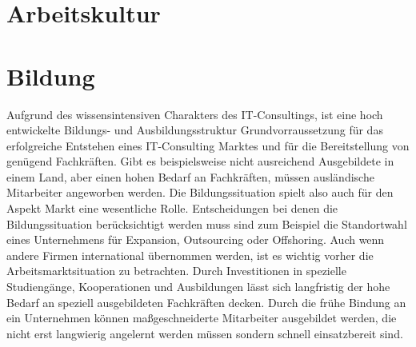 \chapter{Arbeitskultur}


\chapter{Bildung}
Aufgrund des wissensintensiven Charakters des IT-Consultings, ist eine hoch entwickelte Bildungs- und Ausbildungsstruktur Grundvorraussetzung für das erfolgreiche Entstehen eines IT-Consulting Marktes und für die Bereitstellung von genügend Fachkräften.
Gibt es beispielsweise nicht ausreichend Ausgebildete in einem Land, aber einen hohen Bedarf an Fachkräften, müssen ausländische Mitarbeiter angeworben werden. Die Bildungssituation spielt also auch für den Aspekt Markt eine wesentliche Rolle.
Entscheidungen bei denen die Bildungssituation berücksichtigt werden muss sind zum Beispiel die Standortwahl eines Unternehmens für Expansion, Outsourcing oder Offshoring. Auch wenn andere Firmen international übernommen werden, ist es wichtig vorher die Arbeitsmarktsituation zu betrachten. Durch Investitionen in spezielle Studiengänge, Kooperationen und Ausbildungen lässt sich langfristig der hohe Bedarf an speziell ausgebildeten Fachkräften decken. Durch die frühe Bindung an ein Unternehmen können maßgeschneiderte Mitarbeiter ausgebildet werden, die nicht erst langwierig angelernt werden müssen sondern schnell einsatzbereit sind.

